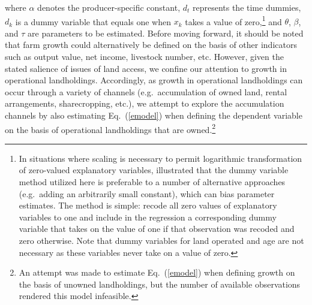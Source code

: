 \documentclass[english]{article}
\begin{document}
\noindent
where $\alpha$ denotes the producer-specific constant, $d_t$ represents the time dummies, $d_k$ is a dummy variable that equals one when $x_k$ takes a value of zero,\footnote{In situations where scaling is necessary to permit logarithmic transformation of zero-valued explanatory variables, \citet{battese1997} illustrated that the dummy variable method utilized here is preferable to a number of alternative approaches (e.g.\ adding an arbitrarily small constant), which can bias parameter estimates. The method is simple: recode all zero values of explanatory variables to one and include in the regression a corresponding dummy variable that takes on the value of one if that observation was recoded and zero otherwise. Note that dummy variables for land operated and age are not necessary as these variables never take on a value of zero.} and $\theta$, $\beta$, and $\tau$ are parameters to be estimated. Before moving forward, it should be noted that farm growth could alternatively be defined on the basis of other indicators such as output value, net income, livestock number, etc. However, given the stated salience of issues of land access, we confine our attention to growth in operational landholdings. Accordingly, as growth in operational landholdings can occur through a variety of channels (e.g.\ accumulation of owned land, rental arrangements, sharecropping, etc.), we attempt to explore the accumulation channels by also estimating Eq.\ (\ref{emodel}) when defining the dependent variable on the basis of operational landholdings that are owned.\footnote{An attempt was made to estimate Eq.\ (\ref{emodel}) when defining growth on the basis of unowned landholdings, but the number of available observations rendered this model infeasible.}
\end{document}
